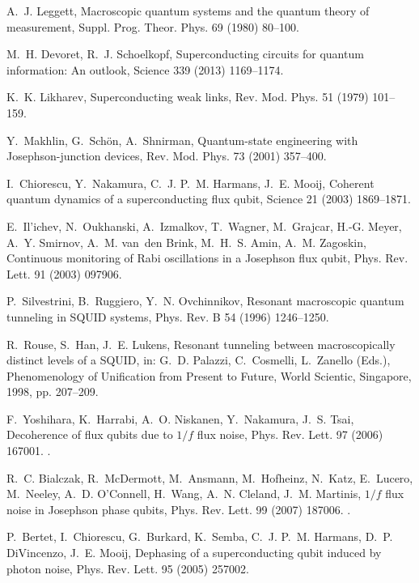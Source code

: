 \documentclass[3p,sort&compress,12pt]{elsarticle}
\begin{document}
\begin{thebibliography}{100}
A.~J. Leggett, Macroscopic quantum systems and the quantum theory of
  measurement, Suppl. Prog. Theor. Phys. 69 (1980) 80--100.

M.~H. Devoret, R.~J. Schoelkopf, Superconducting circuits for quantum
  information: An outlook, Science 339 (2013) 1169--1174.

K.~K. Likharev, Superconducting weak links, Rev. Mod. Phys. 51 (1979) 101--159.

Y.~Makhlin, G.~Sch{\"o}n, A.~Shnirman, Quantum-state engineering with
  {J}osephson-junction devices, Rev. Mod. Phys. 73 (2001) 357--400.

I.~Chiorescu, Y.~Nakamura, C.~J. P.~M. Harmans, J.~E. Mooij, Coherent quantum
  dynamics of a superconducting flux qubit, Science 21 (2003) 1869--1871.

E.~Il'ichev, N.~Oukhanski, A.~Izmalkov, T.~Wagner, M.~Grajcar, H.-G. Meyer,
  A.~Y. Smirnov, A.~M. van~den Brink, M.~H.~S. Amin, A.~M. Zagoskin, Continuous
  monitoring of {R}abi oscillations in a {J}osephson flux qubit, Phys. Rev.
  Lett. 91 (2003) 097906.

P.~Silvestrini, B.~Ruggiero, Y.~N. Ovchinnikov, Resonant macroscopic quantum
  tunneling in {SQUID} systems, Phys. Rev. B 54 (1996) 1246--1250.

R.~Rouse, S.~Han, J.~E. Lukens, Resonant tunneling between macroscopically
  distinct levels of a {SQUID}, in: G.~D. Palazzi, C.~Cosmelli, L.~Zanello
  (Eds.), Phenomenology of Unification from Present to Future, World Scientic,
  Singapore, 1998, pp. 207--209.

F.~Yoshihara, K.~Harrabi, A.~O. Niskanen, Y.~Nakamura, J.~S. Tsai, Decoherence
  of flux qubits due to $1/f$ flux noise, Phys. Rev. Lett. 97 (2006) 167001.
\newblock \href {http://dx.doi.org/10.1103/PhysRevLett.97.167001}
  {}.

R.~C. Bialczak, R.~McDermott, M.~Ansmann, M.~Hofheinz, N.~Katz, E.~Lucero,
  M.~Neeley, A.~D. O'Connell, H.~Wang, A.~N. Cleland, J.~M. Martinis, $1/f$
  flux noise in {J}osephson phase qubits, Phys. Rev. Lett. 99 (2007) 187006.
\newblock \href {http://dx.doi.org/10.1103/PhysRevLett.99.187006}
  {}.

P.~Bertet, I.~Chiorescu, G.~Burkard, K.~Semba, C.~J. P.~M. Harmans, D.~P.
  DiVincenzo, J.~E. Mooij, Dephasing of a superconducting qubit induced by
  photon noise, Phys. Rev. Lett. 95 (2005) 257002.


\end{thebibliography}
\end{document}
